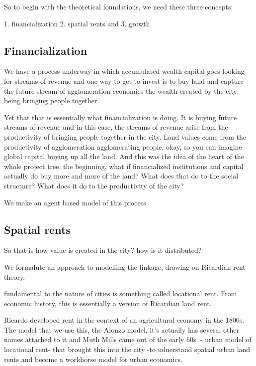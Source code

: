 So to begin with the theoretical foundations, we need these three concepts: 

1. financialization
2. spatial rents and
3. growth

\subsection{Financialization}



We have a process underway in which accumulated wealth capital goes looking for streams of revenue and one way to get to invest is to buy land and capture the future stream of agglomeration economies the wealth created by the city being bringing people together.

Yet that that is essentially what financialization is doing. It is buying future streams of revenue and in this case, the streams of revenue arise from the productivity of bringing people together in the city. Land values come from the productivity of agglomeration agglomerating people, okay, so you can imagine global capital buying up all the land.
And this was the idea of the heart of the whole project tree, the beginning, what if financialized institutions and capital actually do buy more and more of the land? What does that do to the social structure? What does it do to the productivity of the city?

We make an agent based model of this process. 


\subsection{Spatial rents}

So that is how value is created in the city?  how is it distributed?

We formalute an approach to modeliing the linkage, 
 drawing on Ricardian rent theory.

fundamental to the nature of cities is something called locational rent. 
From economic history, this is essentially a version of Ricardian land rent.

Ricardo developed rent in the context of an agricultural economy in the 1800s. 
The model that we use this, the Alonzo model, it's actually has several other names attached to it and Muth Mills came out of the early 60s. - urban model of locational rent- that brought this into the city -to udnerstand spatial urban land rents and become a workhorse model for urban economics.

